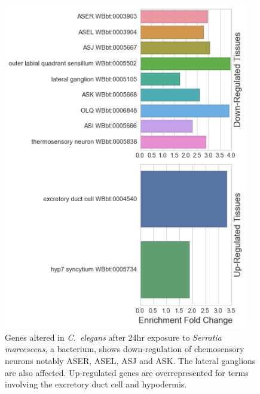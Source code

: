 \documentclass{bmcart}
\begin{document}
\begin{backmatter}
\begin{figure}[h!]
    \includegraphics[width=0.95\textwidth]{figures/SerratiamarcescensEnrichment.png}
	\captionsetup{width= 0.95\textwidth}
  	\caption{ 
      Genes altered in   \emph{C.~elegans} after 24hr exposure to \emph{Serratia marcescens}, a bacterium, shows 
	  down-regulation of chemosensory neurons notably ASER, ASEL, ASJ and ASK. The lateral ganglions are also 
	  affected. Up-regulated genes are overrepresented for terms involving the excretory duct cell and hypodermis.
	}  
	\label{fig:Smar}
\end{figure}
%

\end{backmatter}
\end{document}
